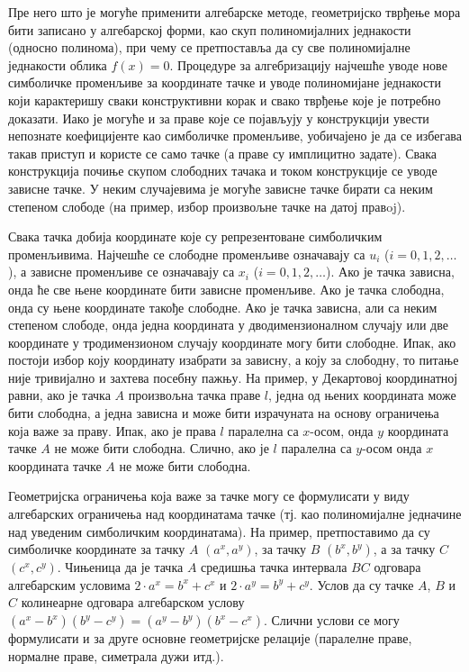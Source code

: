 Пре него што је могуће применити алгебарске методе, геометријско
тврђење мора бити записано у алгебарској форми, као скуп
полиномијалних једнакости (односно полинома), при чему се претпоставља
да су све полиномијалне једнакости облика $f(x) = 0$.  Процедуре за
алгебризацију најчешће уводе нове симболичке променљиве за координате
тачке и уводе полиномијане једнакости који карактеришу сваки
конструктивни корак и свако тврђење које је потребно доказати. Иако је
могуће и за праве које се појављују у конструкцији увести непознате
коефицијенте као симболичке променљиве, уобичајено је да се избегава
такав приступ и користе се само тачке (а праве су имплицитно
задате). Свака конструкција почиње скупом слободних тачака и током
конструкције се уводе зависне тачке. У неким случајевима је могуће
зависне тачке бирати са неким степеном слободе (на пример, избор
произвољне тачке на датој правoj).

Свака тачка добија координате које су репрезентоване симболичким
променљивима. Најчешће се слободне променљиве означавају са $u_i$ ($i
= 0, 1, 2, \ldots$), а зависне променљиве се означавају са $x_i$ ($i =
0, 1, 2, \ldots$). Ако је тачка зависна, онда ће све њене координате
бити зависне променљиве.  Ако је тачка слободна, онда су њене
координате такође слободне. Ако је тачка зависна, али са неким
степеном слободе, онда једна координата у дводимензионалном случају
или две координате у тродимензионом случају координате могу бити
слободне. Ипак, ако постоји избор коју координату изабрати за зависну,
а коју за слободну, то питање није тривијално и захтева посебну
пажњу. На пример, у Декартовој координатној равни, ако је тачка $A$
произвољна тачка праве $l$, једна од њених координата може бити
слободна, а једна зависна и може бити израчуната на основу ограничења
која важе за праву. Ипак, ако је права $l$ паралелна са $x$-осом, онда
$y$ координата тачке $A$ не може бити слободна. Слично, ако је $l$
паралелна са $y$-осом онда $x$ координата тачке $A$ не може бити
слободна.

Геометријска ограничења која важе за тачке могу се формулисати у виду
алгебарских ограничења над координатама тачке (тј. као полиномијалне
једначине над уведеним симболичким координатама). На пример,
претпоставимо да су симболичке координате за тачку $A$ $(a^x, a^y)$,
за тачку $B$ $(b^x, b^y)$, а за тачку $C$ $(c^x, c^y)$. Чињеница
да је тачка $A$ средишња тачка интервала $BC$ одговара алгебарским
условима $2\cdot a^x = b^x + c^x$ и $2\cdot a^y = b^y + c^y$. Услов да
су тачке $A$, $B$ и $C$ колинеарне одговара алгебарском услову $(a^x -
b^x )(b^y - c^y) = (a^y - b^y )(b^x - c^x )$. Слични услови се могу
формулисати и за друге основне геометријске релације (паралелне праве,
нормалне праве, симетрала дужи итд.).


